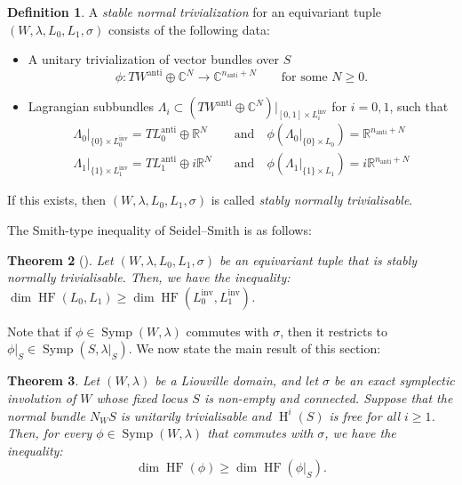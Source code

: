 \documentclass[12pt]{article}
\renewcommand{\ge}{\geqslant}
\theoremstyle{theorem}
\newtheorem{theorem}{Theorem}[section]
\theoremstyle{definition}
\newtheorem{definition}[theorem]{Definition}
\theoremstyle{remark}
\numberwithin{equation}{section}
\newcommand{\C}{{\mathbb{C}}}
\newcommand{\R}{{\mathbb{R}}}
\DeclareMathOperator{\anti}{anti}
\DeclareMathOperator{\inv}{inv}
\DeclareMathOperator{\Symp}{Symp}
\DeclareMathOperator{\HF}{HF}
\DeclareMathOperator{\Ho}{H}
\begin{document}
\begin{definition}
	A \emph{stable normal trivialization} for an equivariant tuple $(W,\lambda,L_0,L_1,\sigma)$ consists of the following data:
\begin{itemize}
	\item A unitary trivialization of vector bundles over $S$
$$
\phi\colon TW^{\anti}\oplus \C^N \to \C^{n_{\anti}+N} \qquad \text{for some $N\ge 0$}.
$$
	\item Lagrangian subbundles $\Lambda_i\subset (TW^{\anti}\oplus \C^N)|_{[0,1]\times L_i^{\inv}}$ for $i=0,1$, such that 
\begin{align*}
\Lambda_0|_{\{0\}\times L^{\inv}_0}=TL_0^{\anti}\oplus \R^N &\quad\text{and}\quad
\phi(\Lambda_0|_{\{0\}\times L_0})=\R^{n_{\anti}+N} \\
\Lambda_1|_{\{1\}\times L^{\inv}_1}=TL_1^{\anti}\oplus i\R^N &\quad\text{and}\quad
\phi(\Lambda_1|_{\{1\}\times L_1})=i\R^{n_{\anti}+N} 
\end{align*}

\end{itemize}
If this exists, then $(W,\lambda,L_0,L_1,\sigma)$ is called \emph{stably normally trivialisable}.
\end{definition}
The Smith-type inequality of Seidel--Smith is as follows:
\begin{theorem}[{\cite[Theorem~1]{SS}}]\label{thm: seidel_smith}
Let $(W,\lambda,L_0,L_1,\sigma)$ be an equivariant tuple that is stably normally trivialisable.
Then, we have the inequality: 
$\dim \HF(L_0,L_1)\ge \dim \HF(L_0^{\inv},L_1^{\inv})$.
\end{theorem}
Note that if $\phi\in\Symp(W,\lambda)$ commutes with $\sigma$, then it restricts to $\phi|_S\in \Symp(S,\lambda|_S)$.
We now state the main result of this section:
\begin{theorem}\label{thm: smith_floer}
Let $(W,\lambda)$ be a Liouville domain, and let $\sigma$ be an exact symplectic involution of $W$ whose fixed locus $S$ is non-empty and connected.
Suppose that the normal bundle $N_WS$ is unitarily trivialisable and $\Ho^i(S)$ is free for all $i\ge 1$.
Then, for every $\phi\in \Symp(W,\lambda)$ that commutes with $\sigma$, we have the inequality:
$$
\dim \HF(\phi) \ge \dim \HF(\phi|_S).
$$
\end{theorem}
\end{document}
